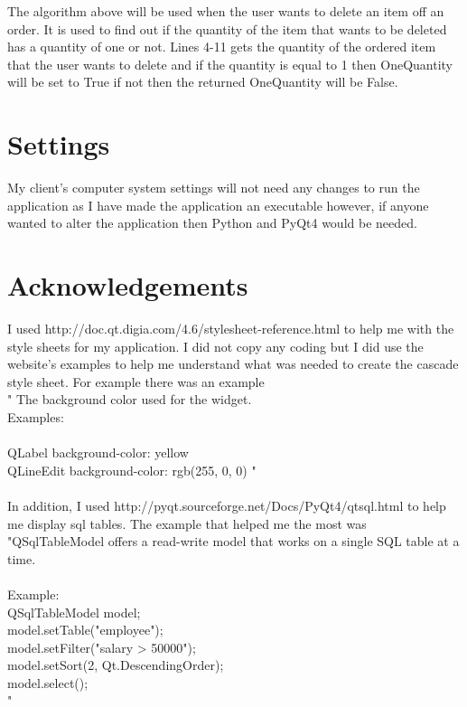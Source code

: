 The algorithm above will be used when the user wants to delete an item off an order. It is used to find out if the quantity of the item that wants to be deleted has a quantity of one or not. Lines 4-11 gets the quantity of the ordered item that the user wants to delete and if the quantity is equal to 1 then OneQuantity will be set to True if not then the returned OneQuantity will be False. 
\section{Settings}

My client's computer system settings will not need any changes to run the application as I have made the application an executable however, if anyone wanted to alter the application then Python and PyQt4 would be needed.

\section{Acknowledgements}

I used http://doc.qt.digia.com/4.6/stylesheet-reference.html to help me with the style sheets for my application. I did not copy any coding but I did use the website's examples to help me understand what was needed to create the cascade style sheet. For example there was an example \\
" The background color used for the widget. \\
Examples: \\ \\
 QLabel { background-color: yellow } \\
 QLineEdit { background-color: rgb(255, 0, 0) }"
\\ \\
In addition, I used http://pyqt.sourceforge.net/Docs/PyQt4/qtsql.html to help me display sql tables. The example that helped me the most was \\
"QSqlTableModel offers a read-write model that works on a single SQL table at a time. \\
\\
Example:
\\
        QSqlTableModel model; \\
        model.setTable("employee"); \\
        model.setFilter("salary > 50000"); \\
        model.setSort(2, Qt.DescendingOrder); \\
        model.select(); \\
"

